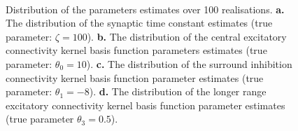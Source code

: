 \documentclass[twocolumn,11pt,a4paper]{article}		%
\begin{document}
\begin{figure}[th]
\\
\caption{Distribution of the parameters estimates over 100
realisations. \textbf{a.} The distribution of the synaptic time constant estimates (true parameter: $\zeta=100$). \textbf{b.} The distribution of the central excitatory connectivity kernel basis function parameters estimates (true parameter: $\theta_0 = 10$). \textbf{c.} The distribution of the surround inhibition connectivity kernel basis function parameter estimates (true parameter: $\theta_1 = -8$). \textbf{d.} The distribution of the longer range excitatory connectivity kernel basis function parameter estimates (true parameter $\theta_3 = 0.5$).}
\label{fig:Parameters}
\end{figure}
\end{document}

